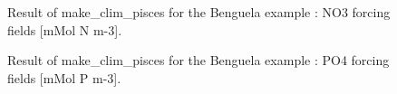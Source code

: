 \begin{figure}[!htbp]
%
\hfill
{}
\caption{Result of make\_clim\_pisces for the Benguela example : NO3 forcing
  fields [mMol N m-3].}
\label{fig:makeclimpiscesNO3}
\end{figure}


\begin{figure}[!htbp]
%
\hfill
{}
\caption{Result of make\_clim\_pisces for the Benguela example : PO4 forcing fields
  [mMol P m-3].}
\label{fig:makeclimpiscesNO4}
\end{figure}

